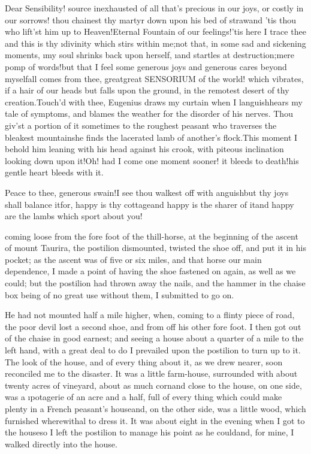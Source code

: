 \documentclass[twoside]{article}
\begin{document}
\tskk Dear Sensibility! source inexhausted
of all that’s precious in our joys, or
costly in our sorrows! thou chainest thy
martyr down upon his bed of straw\tskk and
’tis thou who lift’st him up to
Heaven!\tskk Eternal Fountain of our
feelings!\tskk ’tis here I trace thee\tskk
and this is thy \lqq \i{divinity which stirs
within me};\rqq \tskk not that, in some sad
and sickening moments, \lqq \i{my soul shrinks
back upon herself}, \i{and startles at
destruction};\rqq \tskk mere pomp of
words!\tskk but that I feel some generous
joys and generous cares beyond
myself\tskk all comes from thee,
great\tskk great SENSORIUM of the world!
which vibrates, if a hair of our heads but
falls upon the ground, in the remotest
desert of thy creation.\tskk Touch’d with
thee, Eugenius draws my curtain when I
languish\tskk hears my tale of symptoms,
and blames the weather for the disorder of
his nerves.  Thou giv’st a portion of it
sometimes to the roughest peasant who
traverses the bleakest mountains\tskk he
finds the lacerated lamb of another’s
flock.\tskk This moment I behold him
leaning with his head against his crook,
with piteous inclination looking down upon
it!\tskk Oh! had I come one moment sooner!
it bleeds to death!\tskk his gentle heart
bleeds with it.\tskk 

Peace to thee, generous swain!\tskk I see
thou walkest off with anguish\tskk but
thy joys shall balance it\tskk for, happy
is thy cottage\tskk and happy is the
sharer of it\tskk and happy are the lambs
which sport about you!





\vskip 6pt


 coming loose from the
fore foot of the thill-horse, at the
beginning of the ascent of mount Taurira,
the postilion dismounted, twisted the shoe
off, and put it in his pocket; as the
ascent was of five or six miles, and that
horse our main dependence, I made a point
of having the shoe fastened on again, as
well as we could; but the postilion had
thrown away the nails, and the hammer in
the chaise box being of no great use
without them, I submitted to go on.

He had not mounted half a mile higher,
when, coming to a flinty piece of road,
the poor devil lost a second shoe, and
from off his other fore foot.  I then got
out of the chaise in good earnest; and
seeing a house about a quarter of a mile
to the left hand, with a great deal to do
I prevailed upon the postilion to turn up
to it.  The look of the house, and of
every thing about it, as we drew nearer,
soon reconciled me to the disaster.\tskk
It was a little farm-house, surrounded
with about twenty acres of vineyard, about
as much corn\tskk and close to the house,
on one side, was a \i{potagerie} of an
acre and a half, full of every thing which
could make plenty in a French peasant’s
house\tskk and, on the other side, was a
little wood, which furnished wherewithal
to dress it.  It was about eight in the
evening when I got to the house\tskk so I
left the postilion to manage his point as
he could\tskk and, for mine, I walked
directly into the house.
\end{document}
